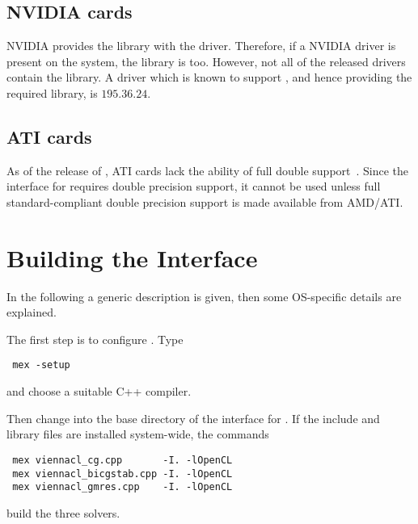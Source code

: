 
\subsection{NVIDIA cards}
NVIDIA provides the {\OpenCL} library with the driver. Therefore, if a 
NVIDIA driver is present on the system, the library is too. However, 
not all of the released drivers contain the {\OpenCL} library. 
A driver which is known to support {\OpenCL}, and hence providing the required
library, is $195.36.24$. 

\subsection{ATI cards}
As of the release of {\ViennaCL}, ATI cards lack the ability of full 
double support~\cite{atidouble}. Since the {\MATLAB} interface for {\ViennaCL} requires double precision support,
it cannot be used unless full standard-compliant double precision support is made available from AMD/ATI.

\section{Building the {\MATLAB} Interface}

In the following a generic description is given, then some OS-specific details are explained.

The first step is to configure {\MATLAB}. Type
\begin{lstlisting}
 mex -setup
\end{lstlisting}
and choose a suitable C++ compiler.


Then change into the base directory of the {\MATLAB} interface for {\ViennaCL}. If the {\OpenCL} include and library files are installed system-wide, the commands
\begin{lstlisting}
 mex viennacl_cg.cpp       -I. -lOpenCL
 mex viennacl_bicgstab.cpp -I. -lOpenCL
 mex viennacl_gmres.cpp    -I. -lOpenCL
\end{lstlisting}
build the three solvers.

